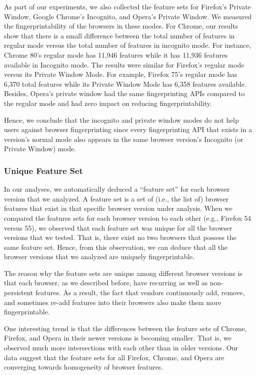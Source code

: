 As part of our experiments, we also collected the feature sets for Firefox's Private Window,
Google Chrome's Incognito, and Opera's Private Window. We measured the
fingerprintability of the browsers in these modes. For Chrome, our results show
that there is a small difference between the total number of features in regular
mode versus the total number of features in incognito mode. For instance,
Chrome 80's regular mode has 11,946 features while it has 11,936 features
available in Incognito mode. The results were similar for Firefox's regular mode
versus its Private Window Mode. For example, Firefox 75's regular mode has 6,370
total features while its Private Window Mode has 6,358 features available. Besides,
Opera's private window had the same fingerprinting APIs compared to the regular mode
and had zero impact on reducing fingerprintability.

Hence, we conclude that the incognito and private window modes do not help
users against browser fingerprinting since every fingerprinting API that exists
in a version's normal mode also appears in the same browser version's Incognito
(or Private Window) mode.

\subsubsection{Unique Feature Set}

In our analyses, we automatically deduced a ``feature set'' for each
browser version that we analyzed. A feature set is a set of (i.e., the
list of) browser features that exist in that specific browser version
under analysis. When we compared the features sets for each browser
version to each other (e.g., Firefox 54 versus 55), we observed that
each feature set was unique for all the browser versions that we
tested. That is, there exist no two browsers that possess the same
feature set. Hence, from this observation, we can deduce that all the
browser versions that we analyzed are uniquely fingerprintable.

The reason why the feature sets are unique among different browser
versions is that each browser, as we described before, have recurring
as well as non-persistent features. As a result, the fact that vendors
continuously add, remove, and sometimes re-add features into their
browsers also make them more fingerprintable.


One interesting trend is that the differences between the feature sets
of Chrome, Firefox, and Opera in their newer versions is becoming smaller.
That is, we observed much more intersections with each other than in
older versions. Our data suggest that the feature sets for all
Firefox, Chrome, and Opera are converging towards homogeneity of browser
features.
